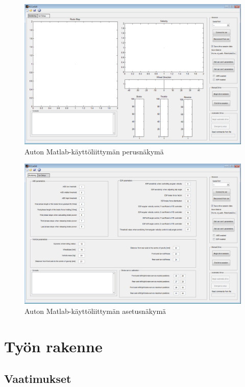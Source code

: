 \documentclass{article}
\begin{document}
\begin{figure}[h]
\centering
\includegraphics[width=\textwidth]{images/gui1}
\caption{Auton Matlab-käyttöliittymän perusnäkymä}
\label{fig:gui1}
\end{figure}

\begin{figure}[h]
\centering
\includegraphics[width=\textwidth]{images/gui2}
\caption{Auton Matlab-käyttöliittymän asetusnäkymä}
\label{fig:gui2}
\end{figure}

\section{Työn rakenne}

\subsection{Vaatimukset}
\end{document}
